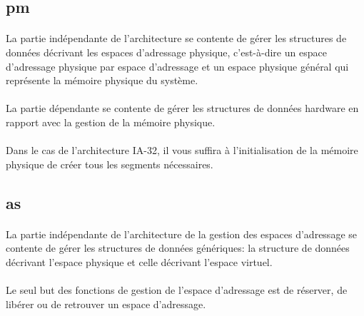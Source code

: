 \documentclass[10pt,a4wide]{article}
\begin{document}
\subsection{pm}

\paragraph{}

La partie ind\'ependante de l'architecture se contente de g\'erer les
structures de donn\'ees d\'ecrivant les espaces d'adressage physique,
c'est-\`a-dire un espace d'adressage physique par espace d'adressage
et un espace physique g\'en\'eral qui repr\'esente la m\'emoire
physique du syst\`eme.

\paragraph{}

La partie d\'ependante se contente de g\'erer les structures de donn\'ees
hardware en rapport avec la gestion de la m\'emoire physique.

\paragraph{}

Dans le cas de l'architecture IA-32, il vous suffira \`a l'initialisation de la
m\'emoire physique de cr\'eer tous les segments n\'ecessaires.

\subsection{as}

\paragraph{}

La partie ind\'ependante de l'architecture de la gestion des espaces
d'adressage se contente de g\'erer les structures de donn\'ees
g\'en\'eriques: la structure de donn\'ees d\'ecrivant l'espace physique
et celle d\'ecrivant l'espace virtuel.

\paragraph{}

Le seul but des fonctions de gestion de l'espace d'adressage est de
r\'eserver, de lib\'erer ou de retrouver un espace d'adressage.
\end{document}
